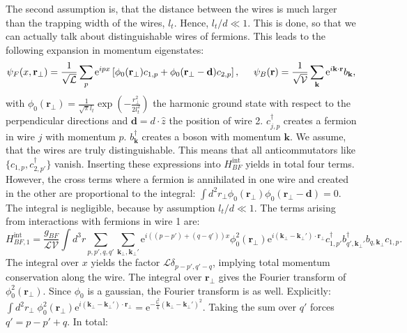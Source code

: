 The second assumption is, that the distance between the wires is much larger than the trapping width of the wires, $l_t$. Hence, $l_t/d \ll 1$. This is done, so that we can actually talk about distinguishable wires of fermions. This leads to the following expansion in momentum eigenstates:
\begin{equation}
\psi_F(x,\mathbf{r}_\perp) = \frac{1}{\sqrt{\mathcal{L}}}\sum_p \text{e}^{ipx} \left[\phi_0(\mathbf{r}_\perp) c_{1,p} + \phi_0(\mathbf{r}_\perp - \mathbf{d}) c_{2,p}\right], \hspace{0.5cm} \psi_B(\mathbf{r}) = \frac{1}{\sqrt{\mathcal{V}}}\sum_{\mathbf{k}} \text{e}^{i\mathbf{k}\cdot \mathbf{r}} b_\mathbf{k}, 
\end{equation}  
with $\phi_0(\mathbf{r}_\perp) = \frac{1}{\sqrt{\pi}l_t}\exp\left(-\frac{r_\perp^2}{2l_t^2}\right)$ the harmonic ground state with respect to the perpendicular directions and $\mathbf{d} = d\cdot\hat{z}$ the position of wire 2. $c^\dagger_{j,p}$ creates a fermion in wire $j$ with momentum $p$. $b^\dagger_\mathbf{k}$ creates a boson with momentum $\mathbf{k}$.  We assume, that the wires are truly distinguishable. This means that all anticommutators like $\{c_{1,p}, c^\dagger_{2,p'}\}$ vanish. Inserting these expressions into $H_{BF}^\text{int}$ yields in total four terms. However, the cross terms where a fermion is annihilated in one wire and created in the other are proportional to the integral: $\int d^2 r_\perp \phi_0(\mathbf{r}_\perp)\phi_0(\mathbf{r}_\perp-\mathbf{d}) = 0$. The integral is negligible, because by assumption $l_t/d \ll 1$. The terms arising from interactions with fermions in wire 1 are:
\begin{equation}
H_{BF, 1}^{\text{int}} = \frac{g_{BF}}{\mathcal{LV}}\int d^3 r \sum_{p,p',q,q'}\sum_{\mathbf{k}_{\perp},\mathbf{k}_{\perp}'}\text{e}^{i((p-p')+(q-q'))x} \phi^2_0(\mathbf{r}_{\perp})\text{e}^{i(\mathbf{k}_{\perp} - \mathbf{k}_{\perp}')\cdot \mathbf{r}_\perp} c^\dagger_{1,p'} b^\dagger_{q',\mathbf{k}_\perp'}b_{q,\mathbf{k}_\perp}c_{1,p}. \nonumber
\end{equation}
The integral over $x$ yields the factor $\mathcal{L}\delta_{p-p',q'-q}$, implying total momentum conservation along the wire. The integral over $\mathbf{r}_\perp$ gives the Fourier transform of $\phi_0^2(\mathbf{r}_\perp)$. Since $\phi_0$ is a gaussian, the Fourier transform is as well. Explicitly: $\int d^2 r_\perp \; \phi^2_0(\mathbf{r}_{\perp})\text{e}^{i(\mathbf{k}_{\perp}-\mathbf{k}_{\perp}')\cdot \mathbf{r}_\perp} = \text{e}^{-\frac{l_t^2}{4}(\mathbf{k}_{\perp}-\mathbf{k}_{\perp}')^2}$. Taking the sum over $q'$ forces $q' = p - p' + q$. In total:

